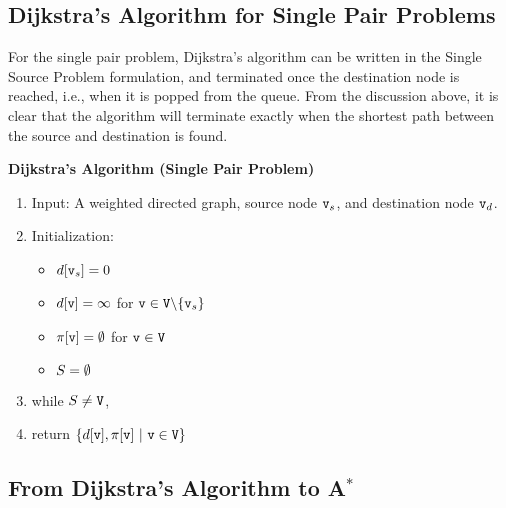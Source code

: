 \subsection{Dijkstra's Algorithm for Single Pair Problems}

For the single pair problem, Dijkstra's algorithm can be written in the Single Source Problem formulation, and terminated once the destination node is reached, i.e., when it is popped from the queue. From the discussion above, it is clear that the algorithm will terminate exactly when the shortest path between the source and destination is found.

\begin{algorithm_}\textbf{Dijkstra's Algorithm (Single Pair Problem)}
\begin{enumerate}
\item{Input:} A weighted directed graph, source node ${\tt v}_s$, and destination node ${\tt v}_d$.

\item Initialization:
\begin{itemize}
  \item[] $d[{\tt v}_s] = 0$
  \item[] $d[{\tt v}] = \infty $ for ${\tt v} \in {\tt V}\backslash \{ {\tt v}_s\} $
  \item[] $\pi [{\tt v}] = \emptyset $ for ${\tt v} \in {\tt V}$
  \item[] ${S} = \emptyset $
\end{itemize}

\item while ${S} \ne {\tt V}$,





\item return $\{ d[\nodev],\policy [\nodev] \ |\ \nodev \in \nodes\} $
\end{enumerate}
\end{algorithm_}

\subsection{From Dijkstra's Algorithm to A$^*$}


